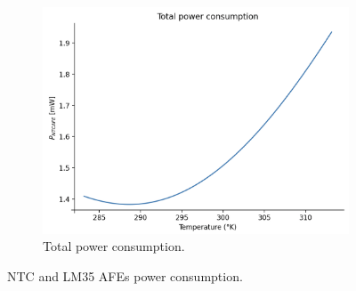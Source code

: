\documentclass[12pt]{article}
\begin{document}
\begin{figure}[h]
\begin{subfigure}{0.45\textwidth}
            \includegraphics*[scale = 0.35]{images/PowerTotal.png}
            \caption{Total power consumption.}
        \end{subfigure}
        \caption{NTC and LM35 AFEs power consumption.}
    \end{figure}

    
\end{document}
